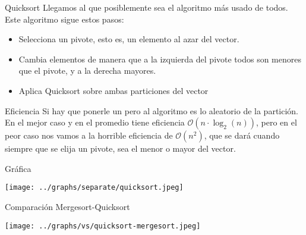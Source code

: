 \documentclass[compress]{beamer}
\begin{document}
\begin{frame}{Quicksort}
Llegamos al que posiblemente sea el algoritmo más usado de todos. Este algoritmo sigue estos pasos:\\
\vspace{0.20in}
	\begin{itemize}
	\item Selecciona un pivote, esto es, un elemento al azar del vector.
	\item Cambia elementos de manera que a la izquierda del pivote todos son menores que el pivote, y a la derecha mayores.
	\item Aplica Quicksort sobre ambas particiones del vector
	\end{itemize}
\vspace{0.20in}
	\begin{block}{Eficiencia}
	Si hay que ponerle un pero al algoritmo es lo aleatorio de la partición. En el mejor caso y en el promedio tiene eficiencia $\mathcal{O}(n\cdot\log_2(n))$, pero en el peor caso nos vamos a la horrible eficiencia de $\mathcal{O}(n^2)$, que se dará cuando siempre que se elija un pivote, sea el menor o mayor del vector.
	\end{block}
\end{frame}

\begin{frame}{Gráfica}
	\begin{alertblock}{}
		\begin{center}
		\texttt{[image: ../graphs/separate/quicksort.jpeg]}
		\end{center}
	\end{alertblock}
\end{frame}

\begin{frame}{Comparación Mergesort-Quicksort}
	\begin{alertblock}{}
		\begin{center}
		\texttt{[image: ../graphs/vs/quicksort-mergesort.jpeg]}
		\end{center}
	\end{alertblock}
\end{frame}
\end{document}

